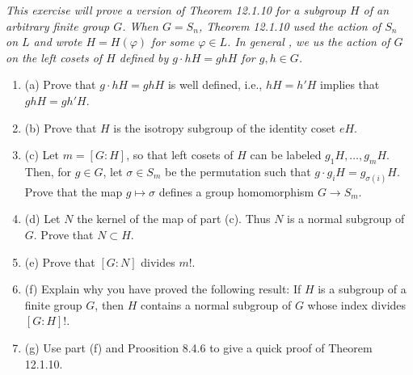 \documentclass[11pt,a4paper]{article}
\newcommand{\be} {\begin{enumerate}}
\newcommand{\ee} {\end{enumerate}}
\begin{document}
{\it This exercise will prove a version of Theorem 12.1.10 for a subgroup $H$ of an arbitrary finite group $G$. When $G=S_n$, Theorem 12.1.10 used the action of $S_n$ on $L$ and wrote $H = H(\varphi)$ for some $\varphi \in L$. In general , we us the action of $G$ on the left cosets of $H$ defined by $g\cdot hH = ghH$ for $g,h \in G$.
\be
\item[(a)] Prove that $g\cdot hH = gh H$ is well defined, i.e., $hH = h'H$ implies that $ghH = gh'H$.
\item[(b)] Prove that $H$ is the isotropy subgroup of the identity coset $eH$.
\item[(c)] Let $m=[G:H]$, so that left cosets of $H$ can be labeled $g_1H,\ldots,g_mH$. Then, for $g\in G$, let $\sigma \in S_m$ be the permutation such that $g\cdot g_iH = g_{\sigma(i)}H$. Prove that the map $g\mapsto \sigma$ defines a group homomorphism $G \to S_m$.
\item[(d)] Let $N$ the kernel of the map of part (c). Thus $N$ is a normal subgroup of $G$. Prove that $N \subset H$.
\item[(e)] Prove that $[G:N]$ divides $m!$.
\item[(f)] Explain why you have proved the following result: If $H$ is a subgroup of a finite group $G$, then $H$ contains a normal subgroup of $G$ whose index divides $[G:H]!$.
\item[(g)] Use part (f) and Proosition 8.4.6 to give a quick proof of Theorem 12.1.10.
\ee
}
\end{document}
